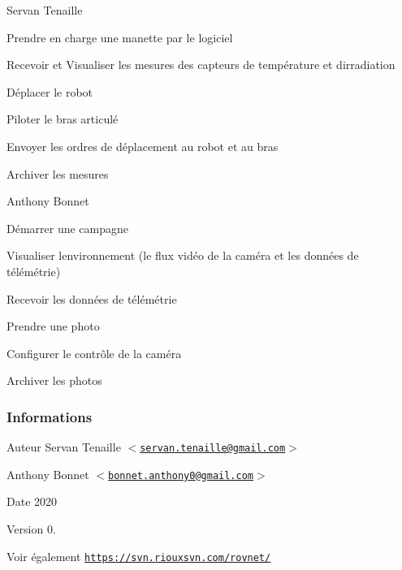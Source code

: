 \begin{DoxyItemize}
\item Servan Tenaille
\begin{DoxyItemize}
\item Prendre en charge une manette par le logiciel
\item Recevoir et Visualiser les mesures des capteurs de température et d\textquotesingle{}irradiation
\item Déplacer le robot
\item Piloter le bras articulé
\item Envoyer les ordres de déplacement au robot et au bras
\item Archiver les mesures
\end{DoxyItemize}
\item Anthony Bonnet
\begin{DoxyItemize}
\item Démarrer une campagne
\item Visualiser l\textquotesingle{}environnement (le flux vidéo de la caméra et les données de télémétrie)
\item Recevoir les données de télémétrie
\item Prendre une photo
\item Configurer le contrôle de la caméra
\item Archiver les photos
\end{DoxyItemize}
\end{DoxyItemize}\hypertarget{page__r_e_a_d_m_e_informations}{}\subsubsection{Informations}\label{page__r_e_a_d_m_e_informations}
\begin{DoxyAuthor}{Auteur}
Servan Tenaille $<$\href{mailto:servan.tenaille@gmail.com}{\tt servan.\+tenaille@gmail.\+com}$>$ 

Anthony Bonnet $<$\href{mailto:bonnet.anthony0@gmail.com}{\tt bonnet.\+anthony0@gmail.\+com}$>$ 
\end{DoxyAuthor}
\begin{DoxyDate}{Date}
2020 
\end{DoxyDate}
\begin{DoxyVersion}{Version}
0. 
\end{DoxyVersion}
\begin{DoxySeeAlso}{Voir également}
\href{https://svn.riouxsvn.com/rovnet/}{\tt https\+://svn.\+riouxsvn.\+com/rovnet/} 
\end{DoxySeeAlso}
